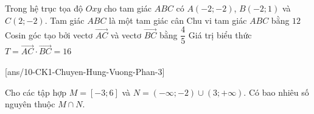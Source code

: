 \begin{ex}%
Trong hệ trục tọa độ $Oxy$ cho tam giác $ABC$ có $A(-2;-2)$, $B(-2; 1)$ và $C(2;-2)$.
\choiceTF
{Tam giác $ABC$ là một tam giác cân}
{\True Chu vi tam giác $ABC$ bằng $12$}
{\True Cosin góc tạo bởi vectơ $\overrightarrow{AC}$ và vectơ $\overrightarrow{BC}$ bằng $\dfrac{4}{5}$}
{\True Giá trị biểu thức $T=\overrightarrow{AC} \cdot \overrightarrow{BC}=16$}
\end{ex}



\caukq
{}[ans/10-CK1-Chuyen-Hung-Vuong-Phan-3]
\begin{ex}%
Cho các tập hợp $ M=[-3; 6]$ và $N=(-\infty;-2) \cup(3;+\infty)$. Có bao nhiêu số nguyên thuộc $ M \cap N$.
\end{ex}

